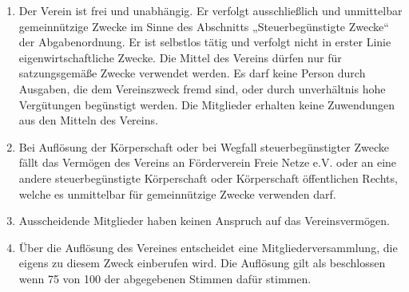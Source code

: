 \documentclass[12pt,a4paper]{article}
\begin{document}
\begin{enumerate}
\begin{itemize}
\end{itemize}
\item Der Verein ist frei und unabhängig. Er verfolgt ausschließlich und unmittelbar gemeinnützige Zwecke im Sinne des Abschnitts „Steuerbegünstigte Zwecke“ der Abgabenordnung. Er ist selbstlos tätig und verfolgt nicht in erster Linie eigenwirtschaftliche Zwecke. Die Mittel des Vereins dürfen nur für satzungsgemäße Zwecke verwendet werden. Es darf keine Person durch Ausgaben, die dem Vereinszweck fremd sind, oder durch unverhältnis hohe Vergütungen begünstigt werden. Die Mitglieder erhalten keine Zuwendungen aus den Mitteln des Vereins.
\item Bei Auflösung der Körperschaft oder bei Wegfall steuerbegünstigter Zwecke fällt das Vermögen des Vereins an Förderverein Freie Netze e.V. oder an eine andere steuerbegünstigte Körperschaft oder Körperschaft öffentlichen Rechts, welche es unmittelbar für gemeinnützige Zwecke verwenden darf. 
\item Ausscheidende Mitglieder haben keinen Anspruch auf das Vereinsvermögen. 
\item Über die Auflösung des Vereines entscheidet eine Mitgliederversammlung, die eigens zu diesem Zweck einberufen wird. Die Auflösung gilt als beschlossen wenn 75 von 100 der abgegebenen Stimmen dafür stimmen. 
\end{enumerate}
\end{document}
